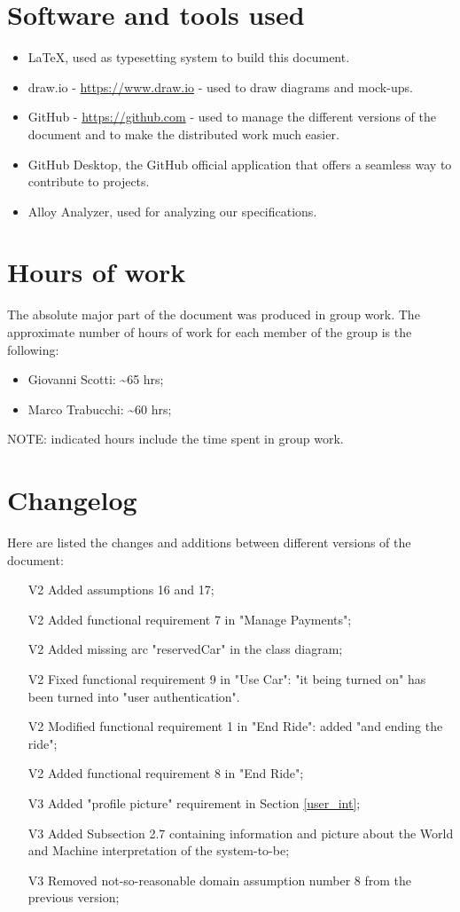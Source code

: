 \section{Software and tools used}
\begin{itemize}
\item \LaTeX, used as typesetting system to build this document.
\item draw.io - \url{https://www.draw.io} - used to draw diagrams and mock-ups.
\item GitHub - \url{https://github.com} - used to manage the different versions of the document and to make the distributed work much easier.
\item GitHub Desktop, the GitHub official application that offers a seamless way to contribute to projects.
\item Alloy Analyzer, used for analyzing our specifications.
\end{itemize}
\section{Hours of work}
The absolute major part of the document was produced in group work. The approximate number of hours of work for each member of the group is the following:

\begin{itemize}
\item Giovanni Scotti: \textasciitilde 65 hrs;
\item Marco Trabucchi: \textasciitilde 60 hrs;
\end{itemize}

NOTE: indicated hours include the time spent in group work.

\section{Changelog}
Here are listed the changes and additions between different versions of the document:
\begin{itemize}
\item[V2] Added assumptions 16 and 17;
\item[V2] Added functional requirement 7 in "Manage Payments";
\item[V2] Added missing arc "reservedCar" in the class diagram;
\item[V2] Fixed functional requirement 9 in "Use Car": "it being turned on" has been turned into "user authentication".
\item[V2] Modified functional requirement 1 in "End Ride": added "and ending the ride";
\item[V2] Added functional requirement 8 in "End Ride";
\item[V3] Added "profile picture" requirement in Section \ref{user_int};
\item[V3] Added Subsection 2.7 containing information and picture about the World and Machine interpretation of the system-to-be;
\item[V3] Removed not-so-reasonable domain assumption number 8 from the previous version;
\end{itemize}
